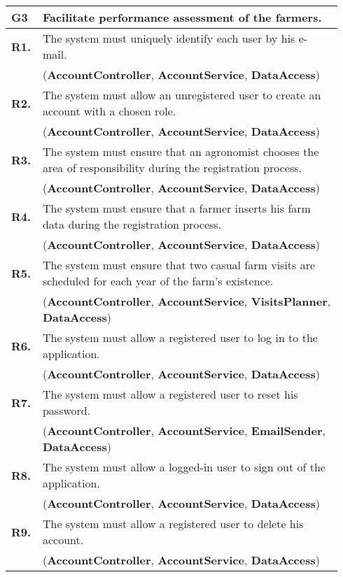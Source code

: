 \begin{longtable}{p{0.06\linewidth} p{0.88\linewidth}} 
    \toprule
    \textbf{G3} & Facilitate performance assessment of the farmers. \\
    \midrule
    
	\textbf{R1.} & The system must uniquely identify each user by his e-mail. \\
	& (\textbf{AccountController}, \textbf{AccountService}, \textbf{DataAccess})\\
	\textbf{R2.} & The system must allow an unregistered user to create an account with a chosen role. \\
	& (\textbf{AccountController}, \textbf{AccountService}, \textbf{DataAccess})\\
	\textbf{R3.} & The system must ensure that an agronomist chooses the area of responsibility during the registration process. \\
	& (\textbf{AccountController}, \textbf{AccountService}, \textbf{DataAccess})\\
	\textbf{R4.} & The system must ensure that a farmer inserts his farm data during the registration process.\\
	& (\textbf{AccountController}, \textbf{AccountService}, \textbf{DataAccess})\\
	\textbf{R5.} & The system must ensure that two casual farm visits are scheduled for each year of the farm's existence.\\
	& (\textbf{AccountController}, \textbf{AccountService}\todo{Added VisitsPlanner}, \textbf{VisitsPlanner}, \textbf{DataAccess})\\
	\textbf{R6.} & The system must allow a registered user to log in to the application. \\
	& (\textbf{AccountController}, \textbf{AccountService}, \textbf{DataAccess})\\
	\textbf{R7.} & The system must allow a registered user to reset his password. \\
	& (\textbf{AccountController}, \textbf{AccountService}, \textbf{EmailSender}, \textbf{DataAccess})\\
	\textbf{R8.} & The system must allow a logged-in user to sign out of the application.\todo{stateless?}\\
	& (\textbf{AccountController}, \textbf{AccountService}, \textbf{DataAccess})\\
	\textbf{R9.} & The system must allow a registered user to delete his account. \\
	& (\textbf{AccountController}, \textbf{AccountService}, \textbf{DataAccess})\\
	

\end{longtable}
